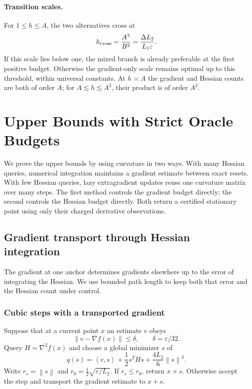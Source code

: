 \documentclass[11pt]{article}
\theoremstyle{remark}
\theoremstyle{remark}
\newcommand{\eps}{\varepsilon}
\newcommand{\norm}[1]{\left\lVert#1\right\rVert}
\newcommand{\ip}[2]{\left\langle#1,#2\right\rangle}
\begin{document}
\paragraph{Transition scales.}
For $1\le h\le A$, the two alternatives cross at
\[
 h_{\rm cross}=\frac{A^3}{B^2}=\frac{\Delta L_2}{L_1\eps}.
\]
If this scale lies below one, the mixed branch is already preferable at the first positive budget. Otherwise the gradient-only scale remains optimal up to this threshold, within universal constants. At $h\asymp A$ the gradient and Hessian counts are both of order $A$; for $A\lesssim h\lesssim A^2$, their product is of order $A^2$.

\section{Upper Bounds with Strict Oracle Budgets}\label{sec:upper}
We prove the upper bounds by using curvature in two ways. With many Hessian queries, numerical integration maintains a gradient estimate between exact resets. With few Hessian queries, lazy extragradient updates reuse one curvature matrix over many steps. The first method controls the gradient budget directly; the second controls the Hessian budget directly. Both return a certified stationary point using only their charged derivative observations.

\subsection{Gradient transport through Hessian integration}\label{sec:transport}
The gradient at one anchor determines gradients elsewhere up to the error of integrating the Hessian. We use bounded path length to keep both that error and the Hessian count under control.

\subsubsection{Cubic steps with a transported gradient}
Suppose that at a current point $x$ an estimate $v$ obeys
\begin{equation}\label{eq:error-invariant}
 \norm{v-\nabla f(x)}\le\delta,\qquad \delta=\eps/32.
\end{equation}
Query $H=\nabla^2f(x)$ and choose a global minimizer $s$ of
\begin{equation}\label{eq:cubic-model}
 q(s)=\ip{v}{s}+\frac12s^THs+\frac{4L_2}{6}\norm{s}^3.
\end{equation}
Write $r_s=\norm{s}$ and $r_0=\tfrac12\sqrt{\eps/L_2}$. If $r_s\le r_0$, return $x+s$. Otherwise accept the step and transport the gradient estimate to $x+s$.
\end{document}
